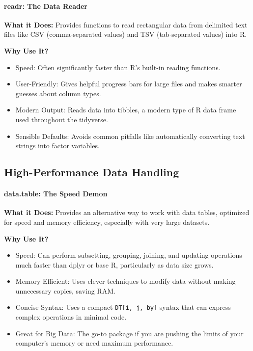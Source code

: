 \paragraph{readr: The Data Reader}

\textbf{What it Does:} Provides functions to read rectangular data from delimited text files like CSV (comma-separated values) and TSV (tab-separated values) into R.

\textbf{Why Use It?}
\begin{itemize}
    \item Speed: Often significantly faster than R’s built-in reading functions.
    \item User-Friendly: Gives helpful progress bars for large files and makes smarter guesses about column types.
    \item Modern Output: Reads data into tibbles, a modern type of R data frame used throughout the tidyverse.
    \item Sensible Defaults: Avoids common pitfalls like automatically converting text strings into factor variables.
\end{itemize}

\subsection{High-Performance Data Handling}

\paragraph{data.table: The Speed Demon}

\textbf{What it Does:} Provides an alternative way to work with data tables, optimized for speed and memory efficiency, especially with very large datasets.

\textbf{Why Use It?}
\begin{itemize}
    \item Speed: Can perform subsetting, grouping, joining, and updating operations much faster than dplyr or base R, particularly as data size grows.
    \item Memory Efficient: Uses clever techniques to modify data without making unnecessary copies, saving RAM.
    \item Concise Syntax: Uses a compact \texttt{DT[i, j, by]} syntax that can express complex operations in minimal code.
    \item Great for Big Data: The go-to package if you are pushing the limits of your computer’s memory or need maximum performance.
\end{itemize}

